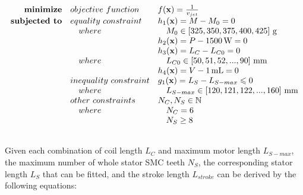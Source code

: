                
                \begin{equation}
                    \begin{array}{rll}
                        \textbf{minimize}       & \small{objective\,\,function}     & f(\textbf{x})=\frac{1}{v_{jet}} \\
                        \textbf{subjected to}   & \small{equality\,\,constraint}    & h_1(\textbf{x})=M - M_0= 0\\
                                                &\quad \small{where}                &\quad  M_0\in\left[325,350,375,400,425\right]\,\mathrm{g}\\
                                                &                                   & h_2(\textbf{x})=P - 1500\,\mathrm{W}=0\\
                                                &                                   & h_3(\textbf{x})=L_C - L_{C0} = 0\\
                                                &\quad \small{where}                &\quad  L_{C0}\in\left[50,51,52,...,90\right]\,\mathrm{mm}\\
                                                &                                   & h_4(\textbf{x})=V - 1\,\mathrm{mL} = 0\\
                                                & \small{inequality\,\,constraint}  & g_1(\textbf{x})=L_S-L_{S-max} \leqslant 0\\
                                                &\quad \small{where}                &\quad L_{S-max} \in \left[120,121,122,...,160\right]\,\mathrm{mm} \\
                                                & \small{other\,\,constraints}       & N_C, N_S \in 	\mathbb{N} \\ 
                                                &\quad \small{where}                &\quad N_C = 6\\
                                                &                                   &\quad N_S \geq 8
                                                \\ \\
                    \end{array}
                    \label{eq:outer optimization for LFSMs}
                \end{equation}
                
                
                
                Given each combination of coil length $L_{C}$ and maximum motor length $L_{S-max}$, the maximum number of whole stator \acs{SMC} teeth $N_S$, the corresponding stator length $L_S$ that can be fitted, and the stroke length $L_{stroke}$ can be derived by the following equations:


